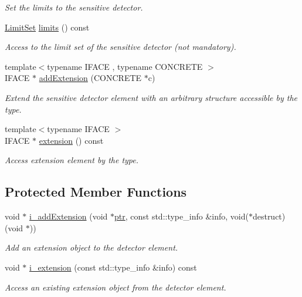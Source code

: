 \begin{DoxyCompactItemize}
\begin{DoxyCompactList}\small\item\em Set the limits to the sensitive detector. \end{DoxyCompactList}\item 
\hyperlink{class_d_d4hep_1_1_geometry_1_1_limit_set}{Limit\+Set} \hyperlink{class_d_d4hep_1_1_geometry_1_1_sensitive_detector_afc33394fa07a926f2707681a66b291df}{limits} () const
\begin{DoxyCompactList}\small\item\em Access to the limit set of the sensitive detector (not mandatory). \end{DoxyCompactList}\item 
{\footnotesize template$<$typename I\+F\+A\+CE , typename C\+O\+N\+C\+R\+E\+TE $>$ }\\I\+F\+A\+CE $\ast$ \hyperlink{class_d_d4hep_1_1_geometry_1_1_sensitive_detector_a08e631451403e41de85669fa625eb86e}{add\+Extension} (C\+O\+N\+C\+R\+E\+TE $\ast$c)
\begin{DoxyCompactList}\small\item\em Extend the sensitive detector element with an arbitrary structure accessible by the type. \end{DoxyCompactList}\item 
{\footnotesize template$<$typename I\+F\+A\+CE $>$ }\\I\+F\+A\+CE $\ast$ \hyperlink{class_d_d4hep_1_1_geometry_1_1_sensitive_detector_ad00fc058ee31292620530e73deb36abc}{extension} () const
\begin{DoxyCompactList}\small\item\em Access extension element by the type. \end{DoxyCompactList}\end{DoxyCompactItemize}
\subsection*{Protected Member Functions}
\begin{DoxyCompactItemize}
\item 
void $\ast$ \hyperlink{class_d_d4hep_1_1_geometry_1_1_sensitive_detector_a210f2df5c333b59b69b148bf089a8719}{i\+\_\+add\+Extension} (void $\ast$\hyperlink{class_d_d4hep_1_1_handle_a6f165a9eec329d2d65172767b5f2777a}{ptr}, const std\+::type\+\_\+info \&info, void($\ast$destruct)(void $\ast$))
\begin{DoxyCompactList}\small\item\em Add an extension object to the detector element. \end{DoxyCompactList}\item 
void $\ast$ \hyperlink{class_d_d4hep_1_1_geometry_1_1_sensitive_detector_af2f80a3cb9d0222a2b6ec5e67e220777}{i\+\_\+extension} (const std\+::type\+\_\+info \&info) const
\begin{DoxyCompactList}\small\item\em Access an existing extension object from the detector element. \end{DoxyCompactList}\end{DoxyCompactItemize}
